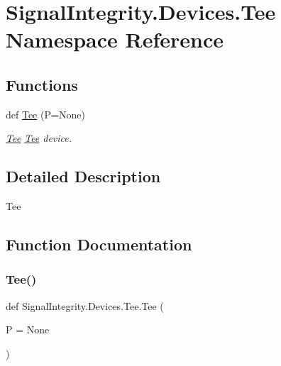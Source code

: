 \hypertarget{namespaceSignalIntegrity_1_1Devices_1_1Tee}{}\section{Signal\+Integrity.\+Devices.\+Tee Namespace Reference}
\label{namespaceSignalIntegrity_1_1Devices_1_1Tee}
\subsection*{Functions}
\begin{DoxyCompactItemize}
\item 
def \hyperlink{namespaceSignalIntegrity_1_1Devices_1_1Tee_af0de7f5a03d1e4f045f05d58d151f60a}{Tee} (P=None)
\begin{DoxyCompactList}\small\item\em \hyperlink{namespaceSignalIntegrity_1_1Devices_1_1Tee}{Tee} \hyperlink{namespaceSignalIntegrity_1_1Devices_1_1Tee}{Tee} device. \end{DoxyCompactList}\end{DoxyCompactItemize}


\subsection{Detailed Description}
\begin{DoxyVerb}Tee\end{DoxyVerb}
 

\subsection{Function Documentation}
\mbox{\label{namespaceSignalIntegrity_1_1Devices_1_1Tee_af0de7f5a03d1e4f045f05d58d151f60a}} 
\subsubsection{\texorpdfstring{Tee()}{Tee()}}
{\footnotesize\ttfamily def Signal\+Integrity.\+Devices.\+Tee.\+Tee (\begin{DoxyParamCaption}\item[{}]{P = {\ttfamily None} }\end{DoxyParamCaption})}



